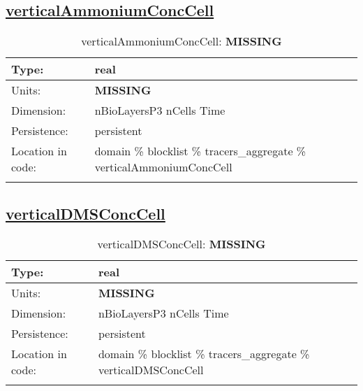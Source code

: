 \subsection[verticalAmmoniumConcCell]{\hyperref[sec:var_tab_tracers_aggregate]{verticalAmmoniumConcCell}}
\label{subsec:var_sec_tracers_aggregate_verticalAmmoniumConcCell}
\begin{center}
\begin{longtable}{| p{2.0in} | p{4.0in} |}
        \hline 
        Type: & real \\
        \hline 
        Units: & {\bf \color{red} MISSING} \\
        \hline 
        Dimension: & nBioLayersP3 nCells Time \\
        \hline 
        Persistence: & persistent \\
        \hline 
         Location in code: & domain \% blocklist \% tracers\_aggregate \% verticalAmmoniumConcCell \\
         \hline 
    \caption{verticalAmmoniumConcCell: {\bf \color{red} MISSING}}
\end{longtable}
\end{center}
\subsection[verticalDMSConcCell]{\hyperref[sec:var_tab_tracers_aggregate]{verticalDMSConcCell}}
\label{subsec:var_sec_tracers_aggregate_verticalDMSConcCell}
\begin{center}
\begin{longtable}{| p{2.0in} | p{4.0in} |}
        \hline 
        Type: & real \\
        \hline 
        Units: & {\bf \color{red} MISSING} \\
        \hline 
        Dimension: & nBioLayersP3 nCells Time \\
        \hline 
        Persistence: & persistent \\
        \hline 
         Location in code: & domain \% blocklist \% tracers\_aggregate \% verticalDMSConcCell \\
         \hline 
    \caption{verticalDMSConcCell: {\bf \color{red} MISSING}}
\end{longtable}
\end{center}
